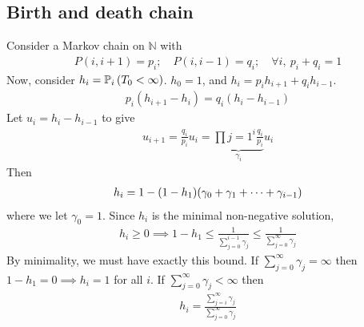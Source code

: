 \subsection{Birth and death chain}
Consider a Markov chain on $\mathbb N$ with
\begin{align*}
	P(i,i+1) = p_i;\quad P(i,i-1) = q_i;\quad \forall i,\ p_i + q_i = 1
\end{align*}
Now, consider $h_i = \mathbb{P}_{i}\left({T_0 < \infty}\right)$.
$h_0 = 1$, and $h_i = p_i h_{i+1} + q_i h_{i-1}$.
\begin{align*}
	p_i (h_{i+1} - h_i) = q_i (h_i - h_{i-1})
\end{align*}
Let $u_i = h_i - h_{i-1}$ to give
\begin{align*}
	u_{i+1} = \frac{q_i}{p_i} u_i = \underbrace{\prod{j=1}^i \frac{q_i}{p_i}}_{\gamma_i} u_i
\end{align*}
Then
\begin{align*}
	h_i = 1 - (1 - h_1) \qty( \gamma_0 + \gamma_1 + \dots + \gamma_{i-1} )
\end{align*}
where we let $\gamma_0 = 1$.
Since $h_i$ is the minimal non-negative solution,
\begin{align*}
	h_i \geq 0 \implies 1 - h_1 \leq \frac{1}{\sum_{j=0}^{i-1} \gamma_j} \leq \frac{1}{\sum_{j=0}^{\infty} \gamma_j}
\end{align*}
By minimality, we must have exactly this bound.
If $\sum_{j=0}^\infty \gamma_j = \infty$ then $1 - h_1 = 0 \implies h_i = 1$ for all $i$.
If $\sum_{j=0}^\infty \gamma_j < \infty$ then
\begin{align*}
	h_i = \frac{\sum_{j=i}^\infty \gamma_j}{\sum_{j=0}^\infty \gamma_j}
\end{align*}

